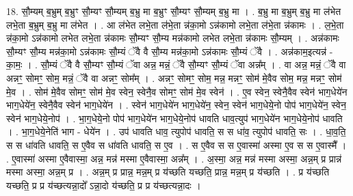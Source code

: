 \documentclass[17pt]{extarticle}
\begin{document}
18. सौ॒म्यम् ब॒भ्रुम् ब॒भ्रुꣳ सौ॒म्यꣳ सौ॒म्यम् ब॒भ्रु मा ब॒भ्रुꣳ सौ॒म्यꣳ सौ॒म्यम् ब॒भ्रु मा । . ब॒भ्रु मा ब॒भ्रुम् ब॒भ्रु मा ल॑भेत लभे॒ता ब॒भ्रुम् ब॒भ्रु मा ल॑भेत । . आ ल॑भेत लभे॒ता ल॑भे॒ता न्न॑का॒मो ऽन्न॑कामो लभे॒ता ल॑भे॒ता न्न॑कामः । . ल॒भे॒ता न्न॑का॒मो ऽन्न॑कामो लभेत लभे॒ता न्न॑कामः सौ॒म्यꣳ सौ॒म्य मन्न॑कामो लभेत लभे॒ता न्न॑कामः सौ॒म्यम् । . अन्न॑कामः सौ॒म्यꣳ सौ॒म्य मन्न॑का॒मो ऽन्न॑कामः सौ॒म्यं ॅवै वै सौ॒म्य मन्न॑का॒मो ऽन्न॑कामः सौ॒म्यं ॅवै । . अन्न॑काम॒इत्यन्न॑ - का॒मः॒ । . सौ॒म्यं ॅवै वै सौ॒म्यꣳ सौ॒म्यं ॅवा अन्न॒ मन्नं॒ ॅवै सौ॒म्यꣳ सौ॒म्यं ॅवा अन्न᳚म् । . वा अन्न॒ मन्नं॒ ॅवै वा अन्नꣳ॒॒ सोमꣳ॒॒ सोम॒ मन्नं॒ ॅवै वा अन्नꣳ॒॒ सोम᳚म् । . अन्नꣳ॒॒ सोमꣳ॒॒ सोम॒ मन्न॒ मन्नꣳ॒॒ सोम॑ मे॒वैव सोम॒ मन्न॒ मन्नꣳ॒॒ सोम॑ मे॒व । . सोम॑ मे॒वैव सोमꣳ॒॒ सोम॑ मे॒व स्वेन॒ स्वेनै॒व सोमꣳ॒॒ सोम॑ मे॒व स्वेन॑ । . ए॒व स्वेन॒ स्वेनै॒वैव स्वेन॑ भाग॒धेये॑न भाग॒धेये॑न॒ स्वेनै॒वैव स्वेन॑ भाग॒धेये॑न । . स्वेन॑ भाग॒धेये॑न भाग॒धेये॑न॒ स्वेन॒ स्वेन॑ भाग॒धेये॒नो पोप॑ भाग॒धेये॑न॒ स्वेन॒ स्वेन॑ भाग॒धेये॒नोप॑ । . भा॒ग॒धेये॒नो पोप॑ भाग॒धेये॑न भाग॒धेये॒नोप॑ धावति धाव॒त्युप॑ भाग॒धेये॑न भाग॒धेये॒नोप॑ धावति । . भा॒ग॒धेये॒नेति॑ भाग - धेये॑न । . उप॑ धावति धाव॒ त्युपोप॑ धावति॒ स स धा॑व॒ त्युपोप॑ धावति॒ सः । . धा॒व॒ति॒ स स धा॑वति धावति॒ स ए॒वैव स धा॑वति धावति॒ स ए॒व । . स ए॒वैव स स ए॒वास्मा॑ अस्मा ए॒व स स ए॒वास्मै᳚ । . ए॒वास्मा॑ अस्मा ए॒वैवास्मा॒ अन्न॒ मन्न॑ मस्मा ए॒वैवास्मा॒ अन्न᳚म् । . अ॒स्मा॒ अन्न॒ मन्न॑ मस्मा अस्मा॒ अन्न॒म् प्र प्रान्न॑ मस्मा अस्मा॒ अन्न॒म् प्र । . अन्न॒म् प्र प्रान्न॒ मन्न॒म् प्र य॑च्छति यच्छति॒ प्रान्न॒ मन्न॒म् प्र य॑च्छति । . प्र य॑च्छति यच्छति॒ प्र प्र य॑च्छत्यन्ना॒दो᳚ ऽन्ना॒दो य॑च्छति॒ प्र प्र य॑च्छत्यन्ना॒दः । \newline
\end{document}
